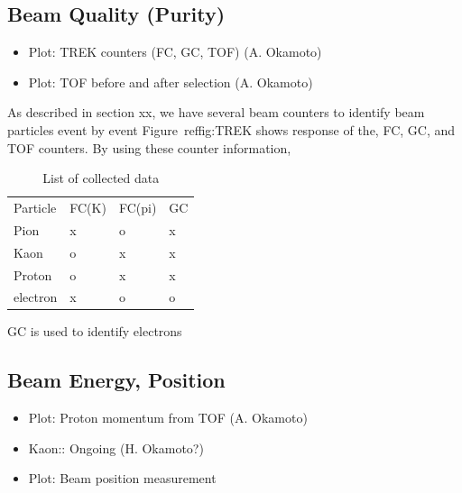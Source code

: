 \subsection{Beam Quality (Purity)}
\begin{itemize}
\item Plot: TREK counters (FC, GC, TOF) (A. Okamoto)
\item Plot: TOF before and after selection  (A. Okamoto)
\end{itemize}

 As described in section xx, we have several beam counters
to identify beam particles event by event
Figure~ref{fig:TREK} shows response of the, FC, GC, and TOF counters.
By using these counter information,

\begin{table}[h]
\begin{tabular}{llll}
  Particle  &FC(K) &FC(pi) &GC\\
  Pion      &x     &o      &x\\
  Kaon      &o     &x      &x\\
  Proton    &o     &x      &x\\
  electron  &x     &o      &o\\

\end{tabular}
\caption{List of collected data}
\label{Table:Data}
\end{table}


GC is used to identify electrons
 
\subsection{Beam Energy, Position}

\begin{itemize}
\item Plot: Proton momentum from TOF  (A. Okamoto)
\item Kaon:: Ongoing  (H. Okamoto?)
\item Plot: Beam position measurement
\end{itemize}


